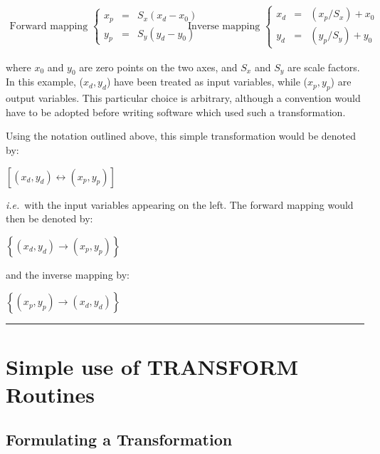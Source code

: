 \documentclass[twoside,nolof,11pt]{starlink}
\providecommand{\exampledone}[0]{\begin{center} \rule{6em}{0.2mm} \end{center}}
\begin{document}
\begin{equation}
\begin{array}{cc}
\mbox{Forward mapping } \left\{
\begin{array}{lll}
x_p & = & S_x(x_d-x_0) \\
y_p & = & S_y(y_d-y_0)
\end{array} \right.
&
\mbox{Inverse mapping } \left\{
\begin{array}{lll}
x_d & = & (x_p/S_x)+x_0 \\
y_d & = & (y_p/S_y)+y_0
\end{array} \right.
\end{array}
\end{equation}

where \mbox{$x_0$} and \mbox{$y_0$} are zero points on the two axes, and
\mbox{$S_x$} and \mbox{$S_y$} are scale factors.
In this example, \mbox{($x_d,y_d$)} have been treated as input variables,
while \mbox{($x_p,y_p$)} are output variables.
This particular choice is arbitrary, although a convention would have to be
adopted before writing software which used such a transformation.

Using the notation outlined above, this simple transformation would be
denoted by:
\begin{center}
$\left[(x_d,y_d) \leftrightarrow{}(x_p,y_p)\right]$
\end{center}

\emph{i.e.}\ with the input variables appearing on the left.
The forward mapping would then be denoted by:
\begin{center}
$\left\{(x_d,y_d) \rightarrow (x_p,y_p)\right\}$
\end{center}

and the inverse mapping by:
\begin{center}
$\left\{(x_p,y_p) \rightarrow (x_d,y_d)\right\}$
\end{center}

\exampledone


\section{Simple use of TRANSFORM Routines}


\subsection{Formulating a Transformation}
\end{document}

